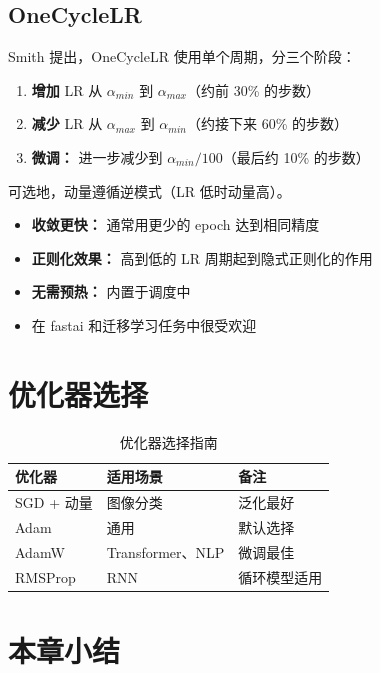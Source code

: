 \subsection{OneCycleLR}

Smith \cite{smith2018disciplined} 提出，OneCycleLR 使用单个周期，分三个阶段：
\begin{enumerate}
    \item \textbf{增加} LR 从 $\alpha_{min}$ 到 $\alpha_{max}$（约前 30\% 的步数）
    \item \textbf{减少} LR 从 $\alpha_{max}$ 到 $\alpha_{min}$（约接下来 60\% 的步数）
    \item \textbf{微调：} 进一步减少到 $\alpha_{min}/100$（最后约 10\% 的步数）
\end{enumerate}
可选地，动量遵循逆模式（LR 低时动量高）。

\begin{properties}
\begin{itemize}
    \item \textbf{收敛更快：} 通常用更少的 epoch 达到相同精度
    \item \textbf{正则化效果：} 高到低的 LR 周期起到隐式正则化的作用
    \item \textbf{无需预热：} 内置于调度中
    \item 在 fastai 和迁移学习任务中很受欢迎
\end{itemize}
\end{properties}

\section{优化器选择}

\begin{table}[ht]
    \centering
    \caption{优化器选择指南}
    \begin{tabular}{L{2.5cm} L{3cm} L{3.5cm}}
        \toprule
        \textbf{优化器} & \textbf{适用场景} & \textbf{备注} \\
        \midrule
        SGD + 动量 & 图像分类 & 泛化最好 \\
        Adam & 通用 & 默认选择 \\
        AdamW & Transformer、NLP & 微调最佳 \\
        RMSProp & RNN & 循环模型适用 \\
        \bottomrule
    \end{tabular}
\end{table}

\section{本章小结}

